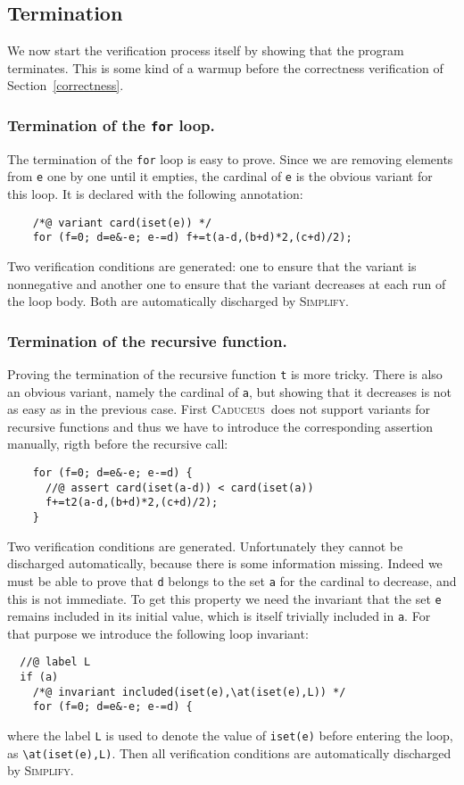 \documentclass[a4paper]{llncs}
\newcommand{\caduceus}{\textsc{Caduceus}}
\newcommand{\simplify}{\textsc{Simplify}}
\begin{document}
\subsection{Termination}

We now start the verification process itself by showing that the
program terminates. This is some kind of a warmup before the
correctness verification of Section~\ref{correctness}.

\subsubsection{Termination of the \texttt{for} loop.}
The termination of the \texttt{for} loop is easy to prove.
Since we are removing elements from \texttt{e} one by one until it
empties, the cardinal of \texttt{e} is the obvious variant for this
loop. It is declared with the following annotation:
\begin{verbatim}
    /*@ variant card(iset(e)) */
    for (f=0; d=e&-e; e-=d) f+=t(a-d,(b+d)*2,(c+d)/2);
\end{verbatim}
Two verification conditions are generated: one to ensure that the
variant is nonnegative and another one to ensure that the variant
decreases at each run of the loop body. Both are automatically
discharged by \simplify.

\subsubsection{Termination of the recursive function.}
Proving the termination of the recursive function \texttt{t} is more
tricky. There is also an obvious variant, namely the cardinal of
\texttt{a}, but showing that it decreases is not as easy as in the
previous case. First \caduceus\ does not support variants for
recursive functions and thus we have to introduce the corresponding
assertion manually, rigth before the recursive call:
\begin{verbatim}
    for (f=0; d=e&-e; e-=d) {
      //@ assert card(iset(a-d)) < card(iset(a))
      f+=t2(a-d,(b+d)*2,(c+d)/2); 
    }
\end{verbatim}
Two verification conditions are generated. 
Unfortunately they cannot be discharged automatically, because there
is some information missing. Indeed we must be able to prove that
\texttt{d} belongs to the set \texttt{a} for the cardinal to decrease,
and this is not immediate. To get this property we need the invariant
that the set \texttt{e} remains included in its initial value, which
is itself trivially included in \texttt{a}. For that purpose we
introduce the following loop invariant:
\begin{verbatim}
  //@ label L
  if (a)
    /*@ invariant included(iset(e),\at(iset(e),L)) */
    for (f=0; d=e&-e; e-=d) {
\end{verbatim}
where the label \texttt{L} is used to denote the value of
\verb!iset(e)! before entering the loop, as \verb!\at(iset(e),L)!.
Then all verification conditions are automatically discharged by \simplify.
\end{document}
